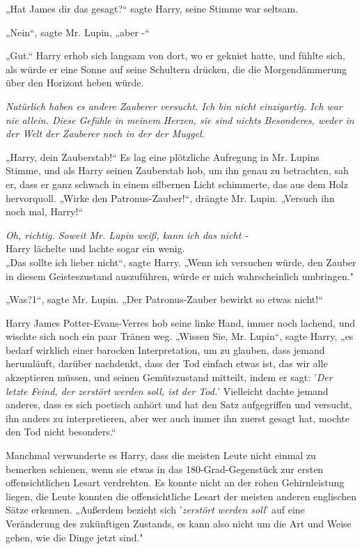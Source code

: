 {„Hat James dir das gesagt?“ sagte Harry, seine Stimme war seltsam.

„Nein“, sagte Mr. Lupin, „aber -“

„Gut.“ Harry erhob sich langsam von dort, wo er gekniet hatte, und fühlte sich, als würde er eine Sonne auf seine Schultern drücken, die die Morgendämmerung über den Horizont heben würde.

\emph{Natürlich haben es andere Zauberer versucht. Ich bin nicht einzigartig. Ich war nie allein. Diese Gefühle in meinem Herzen, sie sind nichts Besonderes, weder in der Welt der Zauberer noch in der der Muggel}.

„Harry, dein Zauberstab!“ Es lag eine plötzliche Aufregung in Mr. Lupins Stimme, und als Harry seinen Zauberstab hob, um ihn genau zu betrachten, sah er, dass er ganz schwach in einem silbernen Licht schimmerte, das aus dem Holz hervorquoll. „Wirke den Patronus-Zauber!“, drängte Mr. Lupin. „Versuch ihn noch mal, Harry!“

\emph{Oh, richtig. Soweit Mr. Lupin weiß, kann ich das nicht -}\\ Harry lächelte und lachte sogar ein wenig.\\ „Das sollte ich lieber nicht“, sagte Harry. „Wenn ich versuchen würde, den Zauber in diesem Geisteszustand auszuführen, würde er mich wahrscheinlich umbringen."

„Was?1“, sagte Mr. Lupin. „Der Patronus-Zauber bewirkt so etwas nicht!“

Harry James Potter-Evans-Verres hob seine linke Hand, immer noch lachend, und wischte sich noch ein paar Tränen weg. „Wissen Sie, Mr. Lupin“, sagte Harry, „es bedarf wirklich einer barocken Interpretation, um zu glauben, dass jemand herumläuft, darüber nachdenkt, dass der Tod einfach etwas ist, das wir alle akzeptieren müssen, und seinen Gemütszustand mitteilt, indem er sagt: '\emph{Der letzte Feind, der zerstört werden soll, ist der Tod.}' Vielleicht dachte jemand anderes, dass es sich poetisch anhört und hat den Satz aufgegriffen und versucht, ihn anders zu interpretieren, aber wer auch immer ihn zuerst gesagt hat, mochte den Tod nicht besonders.“

Manchmal verwunderte es Harry, dass die meisten Leute nicht einmal zu bemerken schienen, wenn sie etwas in das 180-Grad-Gegenstück zur ersten offensichtlichen Lesart verdrehten. Es konnte nicht an der rohen Gehirnleistung liegen, die Leute konnten die offensichtliche Lesart der meisten anderen englischen Sätze erkennen. „Außerdem bezieht sich '\emph{zerstört werden soll}' auf eine Veränderung des zukünftigen Zustands, es kann also nicht um die Art und Weise gehen, wie die Dinge jetzt sind."

}
